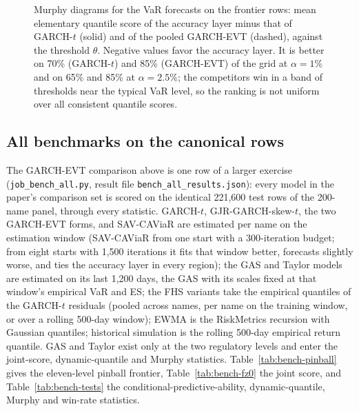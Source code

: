 \documentclass[11pt]{article}
\begin{document}
\begin{figure}[htbp]
\caption{Murphy diagrams for the VaR forecasts on the frontier rows: mean elementary quantile score of the accuracy layer minus that of GARCH-$t$ (solid) and of the pooled GARCH-EVT (dashed), against the threshold $\theta$. Negative values favor the accuracy layer. It is better on 70\% (GARCH-$t$) and 85\% (GARCH-EVT) of the grid at $\alpha=1\%$ and on 65\% and 85\% at $\alpha=2.5\%$; the competitors win in a band of thresholds near the typical VaR level, so the ranking is not uniform over all consistent quantile scores.}
\label{fig:murphy}
\end{figure}

\subsection*{All benchmarks on the canonical rows}
The GARCH-EVT comparison above is one row of a larger exercise (\texttt{job\_bench\_all.py}, result file \texttt{bench\_all\_results.json}): every model in the paper's comparison set is scored on the identical 221,600 test rows of the 200-name panel, through every statistic. GARCH-$t$, GJR-GARCH-skew-$t$, the two GARCH-EVT forms, and SAV-CAViaR are estimated per name on the estimation window (SAV-CAViaR from one start with a 300-iteration budget; from eight starts with 1{,}500 iterations it fits that window better, forecasts slightly worse, and ties the accuracy layer in every region); the GAS and Taylor models are estimated on its last 1{,}200 days, the GAS with its scales fixed at that window's empirical VaR and ES; the FHS variants take the empirical quantiles of the GARCH-$t$ residuals (pooled across names, per name on the training window, or over a rolling 500-day window); EWMA is the RiskMetrics recursion with Gaussian quantiles; historical simulation is the rolling 500-day empirical return quantile. GAS and Taylor exist only at the two regulatory levels and enter the joint-score, dynamic-quantile and Murphy statistics. Table~\ref{tab:bench-pinball} gives the eleven-level pinball frontier, Table~\ref{tab:bench-fz0} the joint score, and Table~\ref{tab:bench-tests} the conditional-predictive-ability, dynamic-quantile, Murphy and win-rate statistics.
\end{document}

